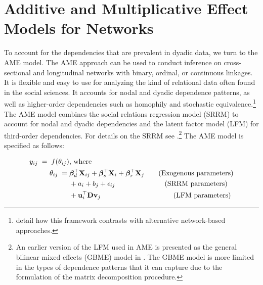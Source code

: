 

\section{\textbf{Additive and Multiplicative Effect Models for Networks}}

To account for the dependencies that are prevalent in dyadic data, we turn to the AME model. The AME approach can be used to conduct inference on cross-sectional and longitudinal networks with binary, ordinal, or continuous linkages. It is flexible and easy to use for analyzing the kind of relational data often found in the social sciences. It accounts for nodal and dyadic dependence patterns, as well as higher-order dependencies such as homophily and stochastic equivalence.\footnote{\citet{minhas:etal:2016:arxiv} detail how this framework contrasts with alternative network-based approaches.} The AME model combines the social relations regression model (SRRM) to account for nodal and dyadic dependencies and the latent factor model (LFM) for third-order dependencies.  For details on the SRRM see \citet{li:loken:2002,hoff:2005,dorff:minhas:2017}.\footnote{An earlier version of the LFM  used in AME is presented as the general bilinear mixed effects (GBME) model in \citet{hoff:ward:2004}. The GBME model is more limited in the types of dependence patterns that it can capture due to the formulation of the matrix decomposition procedure.} The AME model is specified as follows:

\begin{align}
	\begin{aligned}
		y_{ij} \;=\; f(\theta_{ij}) &\text{, where } \\
		\theta_{ij} \;=\;& \bm\beta_{d}^{\top} \mathbf{X}_{ij} + \bm\beta_{s}^{\top} \mathbf{X}_{i} + \bm\beta_{r}^{\top} \mathbf{X}_{j} \text{\qquad(Exogenous parameters)} \\
		& + a_{i} + b_{j} + \epsilon_{ij} \text{\qquad\qquad\qquad\quad(SRRM parameters)} \\
		& + \mathbf{u}_{i}^{\top} \mathbf{D} \mathbf{v}_{j}  \text{\qquad\qquad\qquad\qquad\qquad\;(LFM parameters)} \\ 
	\label{eqn:ame}
	\end{aligned}
\end{align}

